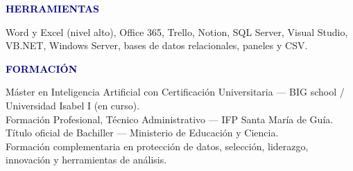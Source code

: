 \documentclass[10pt,a4paper]{article}
\newcommand{\sectiontitle}[1]{\vspace{5pt}\textcolor{navy}{\large\textbf{\MakeUppercase{#1}}}\par\vspace{2pt}}
\begin{document}
\sectiontitle{Herramientas}
Word y Excel (nivel alto), Office 365, Trello, Notion, SQL Server, Visual Studio, VB.NET, Windows Server, bases de datos relacionales, paneles y CSV.

\sectiontitle{Formación}
Máster en Inteligencia Artificial con Certificación Universitaria — BIG school / Universidad Isabel I (en curso).\\
Formación Profesional, Técnico Administrativo — IFP Santa María de Guía.\\
Título oficial de Bachiller — Ministerio de Educación y Ciencia.\\
Formación complementaria en protección de datos, selección, liderazgo, innovación y herramientas de análisis.
\end{document}
